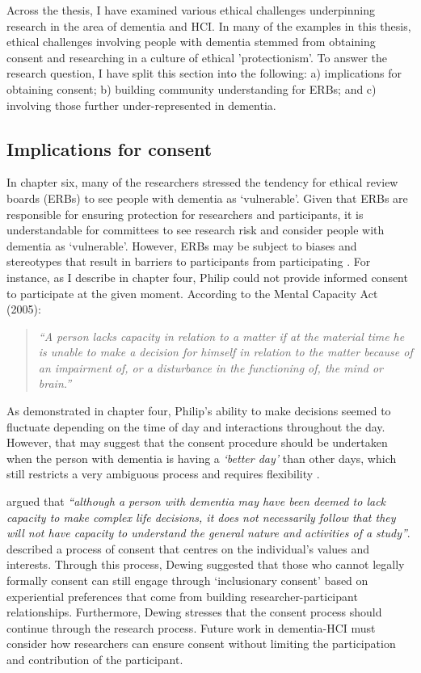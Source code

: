 Across the thesis, I have examined various ethical challenges underpinning research in the area of dementia and HCI. In many of the examples in this thesis, ethical challenges involving people with dementia stemmed from obtaining consent and researching in a culture of ethical 'protectionism'. To answer the research question, I have split this section into the following: a) implications for obtaining consent; b)  building community understanding for ERBs; and c) involving those further under-represented in dementia.

\subsection{Implications for consent}
\label{Cosent-Implications}
In chapter six, many of the researchers stressed the tendency for ethical review boards (ERBs) to see people with dementia as `vulnerable'. Given that ERBs are responsible for ensuring protection for researchers and participants, it is understandable for committees to see research risk and consider people with dementia as `vulnerable'. However, ERBs may be subject to biases and stereotypes that result in barriers to participants from participating \citep{tufford2012conducting}. For instance, as I describe in chapter four, Philip could not provide informed consent to participate at the given moment. According to the Mental Capacity Act (2005):

\begin{quote}
\textit{``A person lacks capacity in relation to a matter if at the material time he is unable to make a decision for himself in relation to the matter because of an impairment of, or a disturbance in the functioning of, the mind or brain.''} \citep{oyebode_mental_2005}
\end{quote}

As demonstrated in chapter four, Philip's ability to make decisions seemed to fluctuate depending on the time of day and interactions throughout the day. However, that may suggest that the consent procedure should be undertaken when the person with dementia is having a \textit{`better day'} than other days, which still restricts a very ambiguous process and requires flexibility \citep{trachsel2015cognitive}. 

\cite{o2021advocating} argued that \textit{``although a person with dementia may have been deemed to lack capacity to make complex life decisions, it does not necessarily follow that they will not have capacity to understand the general nature and activities of a study''}. \cite{dewing_participatory_2007} described a process of consent that centres on the individual's values and interests. Through this process, Dewing suggested that those who cannot legally formally consent can still engage through `inclusionary consent' based on experiential preferences that come from building researcher-participant relationships. Furthermore, Dewing stresses that the consent process should continue through the research process. Future work in dementia-HCI must consider how researchers can ensure consent without limiting the participation and contribution of the participant. 

